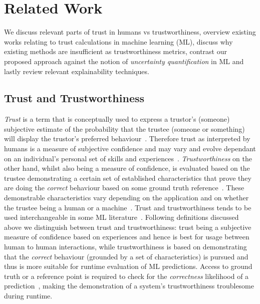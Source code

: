 \section{Related Work}\label{sec:related_work}
%
%
We discuss relevant parts of trust in humans vs trustworthiness, overview existing works relating to trust calculations in machine learning (ML), discuss why existing methods are insufficient as trustworthiness metrics, contrast our proposed approach against the notion of \textit{uncertainty quantification} in ML and lastly review relevant explainability techniques. %
%



\subsection{Trust and Trustworthiness}\label{trustVStrustowrthiness}
\textit{Trust} is a term that is conceptually used to express a trustor's (someone) subjective estimate of the probability that the trustee (someone or something) will display the trustor's preferred behaviour~\cite{Bauer2013}.
%
Therefore trust as interpreted by humans is a measure of subjective confidence and may vary and evolve dependant on an individual's personal set of skills and experiences~\cite{Hommel2015, Mitkidis2017,Najib2019}. 
%
\textit{Trustworthiness} on the other hand, whilst also being a measure of confidence, is evaluated based on the trustee demonstrating a certain set of established characteristics that prove they are doing the \textit{correct} behaviour based on some ground truth reference~\cite{Bauer2013, Bournival2022}.
%
These demonstrable characteristics vary depending on the application and on whether the trustee being a human or a machine~\cite{Wing2021}.
%
Trust and trustworthiness tends to be used interchangeable in some ML literature~\cite{DeBie2021,Jiang2018}.
%
Following definitions discussed above we distinguish between trust and trustworthiness: trust being a subjective measure of confidence based on experiences and hence is best for usage between human to human interactions, while trustworthiness is based on demonstrating that the \textit{correct} behaviour (grounded by a set of characteristics) is pursued and thus is more suitable for runtime evaluation of ML predictions. 
%
Access to ground truth or a reference point is required to check for the \textit{correctness} likelihood of a prediction~\cite{Barr2015}, making the demonstration of a system's trustworthiness troublesome during runtime.

